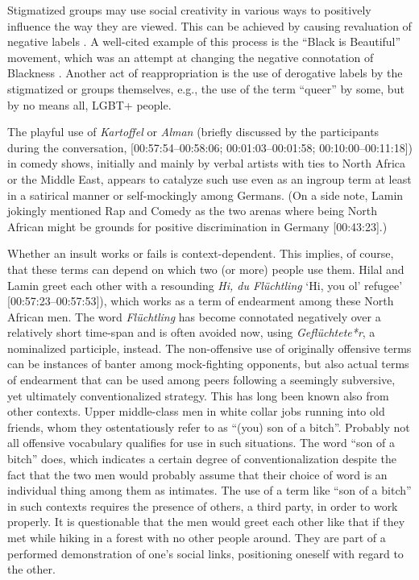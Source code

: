 \documentclass[output=paper,colorlinks,citecolor=brown]{langscibook}
\begin{document}
Stigmatized groups may use social creativity in various ways to positively influence the way they are viewed. This can be achieved by causing revaluation of negative labels \citep{galinsky_hall_cuddy2013,galinsky_wang_whitson_anicich_hugenberg_bodenhausen2013}. A well-cited example of this process is the ``Black is Beautiful'' movement, which was an attempt at changing the negative connotation of Blackness \citep{galinsky_hall_cuddy2013,keblusek_giles_maass2017}. Another act of reappropriation is the use of derogative labels by the stigmatized or  groups themselves, e.g., the use of the term ``queer'' by some, but by no means all, LGBT+ people. 

The playful use of \textit{Kartoffel} or \textit{Alman} (briefly discussed by the participants during the conversation, [00:57:54--00:58:06; 00:01:03--00:01:58; 00:10:00--00:11:18]) in comedy shows, initially and mainly by verbal artists with ties to North Africa or the Middle East, appears to catalyze such use even as an ingroup term at least in a satirical manner or self-mockingly among Germans. (On a side note, Lamin jokingly mentioned Rap and Comedy as the two arenas where being North African might be grounds for positive discrimination in Germany [00:43:23].)

Whether an insult works or fails is context-dependent. This implies, of course, that these terms can depend on which two (or more) people use them. Hilal and Lamin greet each other with a resounding \textit{Hi, du Flüchtling} `Hi, you ol' refugee' [00:57:23--00:57:53]), which works as a term of endearment among these North African men. The  word \textit{Flüchtling} has become connotated negatively over a relatively short time-span and is often avoided now, using \textit{Geflüchtete*r}, a nominalized participle, instead. The non-offensive use of originally offensive terms can be instances of banter among mock-fighting opponents, but also actual terms of endearment that can be used among peers following a seemingly subversive, yet ultimately conventionalized strategy. This has long been known also from other contexts. Upper middle-class men in white collar jobs running into old friends, whom they ostentatiously refer to as ``(you) son of a bitch''. Probably not all offensive vocabulary qualifies for use in such situations. The word ``son of a bitch'' does, which indicates a certain degree of conventionalization despite the fact that the two men would probably assume that their choice of word is an individual thing among them as intimates. The use of a term like ``son of a bitch'' in such contexts requires the presence of others, a third party, in order to work properly. It is questionable that the men would greet each other like that if they met while hiking in a forest with no other people around. They are part of a performed demonstration of one's social links, positioning oneself with regard to the other. 
\end{document}
